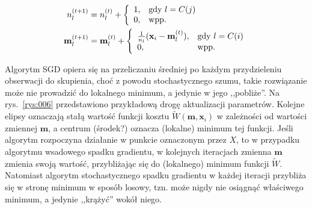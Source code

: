 \documentclass{praca1}
\begin{document}
\begin{align}
n^{(t+1)}_l& = n^{(t)}_l + \left\{
\begin{array}{l l}     
    1, & \text{gdy } l = C(j) \\
    0, & \text{wpp.}
\end{array}\right. \\
\mathbf{m}_l^{(t+1)}& = \mathbf{m}_l^{(t)} + \left\{
\begin{array}{l l}     
    \frac{1}{n_l}(\mathbf{x}_i - \mathbf{m}^{(t)}_l), & \text{gdy } l = C(i) \\
    0, & \text{wpp.}
\end{array}\right.
\end{align}


Algorytm SGD opiera się na przeliczaniu średniej po każdym przydzieleniu obserwacji do skupienia, choć z powodu stochastycznego szumu, takie rozwiązanie może nie prowadzić do lokalnego minimum, a jedynie w jego ,,pobliże''. Na rys.~\ref{rys:006} przedstawiono przykładową drogę aktualizacji parametrów. Kolejne elipsy oznaczają stałą wartość funkcji kosztu $\widetilde{W}(\mathbf{m}, \mathbf{x}_i)$ w zależności od wartości zmiennej $\mathbf{m}$, a centrum (środek?) oznacza (lokalne) minimum tej funkcji. Jeśli algorytm rozpoczyna działanie w punkcie oznaczonym przez $X$, to w przypadku algorytmu wsadowego spadku gradientu, w kolejnych iteracjach zmienna $\mathbf{m}$ zmienia swoją wartość, przybliżając się do (lokalnego) minimum funkcji $\widetilde{W}$. Natomiast algorytm stochastycznego spadku gradientu w każdej iteracji przybliża się w stronę minimum w sposób losowy, tzn. może nigdy nie osiągnąć właściwego minimum, a jedynie ,,krążyć'' wokół niego.
 
\end{document}
